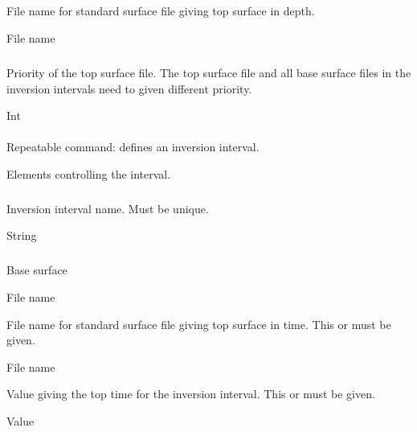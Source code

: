  \subparagraph{} 
 \slist
   \item \Description File name for standard surface file giving top surface in depth.
   \item \Argument File name
   \item \Default
 \elist
 
 \subparagraph{}
 \slist
   \item \Description Priority of the top surface file. The top surface file and all base surface files in the inversion intervals need to given different priority.
   \item \Argument Int
   \item {}
 \elist
 
\paragraph{ \necessary}  
 \slist
 	\item \Description Repeatable command: defines an inversion interval.
 	\item \Argument Elements controlling the interval.
 	\item \Default
 \elist

 \subparagraph{ \necessary} 
 \slist
   \item \Description Inversion interval name. Must be unique.
   \item \Argument String
   \item \Default
 \elist

\subparagraph{ \necessary} 
 \slist
   \item \Description Base surface
   \item \Argument File name
   \item \Default
 \elist
 
 
 \slist
   \item \Description File name for standard surface file giving top surface in time. This or  must be given.
   \item \Argument File name
   \item \Default
 \elist

 
 \slist
   \item \Description Value giving the top time for the inversion interval. This or  must be given.
   \item \Argument Value
   \item \Default
 \elist

